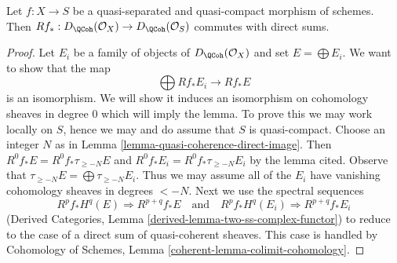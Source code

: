 \begin{lemma}
\label{lemma-quasi-coherence-pushforward-direct-sums}
Let $f : X \to S$ be a quasi-separated and quasi-compact morphism of
schemes. Then
$Rf_* : D_\QCoh(\mathcal{O}_X) \to D_\QCoh(\mathcal{O}_S)$
commutes with direct sums.
\end{lemma}

\begin{proof}
Let $E_i$ be a family of objects of $D_\QCoh(\mathcal{O}_X)$
and set $E = \bigoplus E_i$. We want to show that the map
$$
\bigoplus Rf_*E_i \longrightarrow Rf_*E
$$
is an isomorphism. We will show it induces an isomorphism on
cohomology sheaves in degree $0$ which will imply the lemma.
To prove this we may work locally on $S$, hence we may and do
assume that $S$ is quasi-compact.
Choose an integer $N$ as in Lemma \ref{lemma-quasi-coherence-direct-image}.
Then $R^0f_*E = R^0f_*\tau_{\geq -N}E$ and
$R^0f_*E_i = R^0f_*\tau_{\geq -N}E_i$ by the lemma cited. Observe that
$\tau_{\geq -N}E = \bigoplus \tau_{\geq -N}E_i$.
Thus we may assume all of the $E_i$ have vanishing cohomology
sheaves in degrees $< -N$. Next we use the spectral sequences
$$
R^pf_*H^q(E) \Rightarrow R^{p + q}f_*E
\quad\text{and}\quad
R^pf_*H^q(E_i) \Rightarrow R^{p + q}f_*E_i
$$
(Derived Categories, Lemma \ref{derived-lemma-two-ss-complex-functor})
to reduce to the case of a direct sum of quasi-coherent sheaves.
This case is handled by
Cohomology of Schemes, Lemma \ref{coherent-lemma-colimit-cohomology}.
\end{proof}
